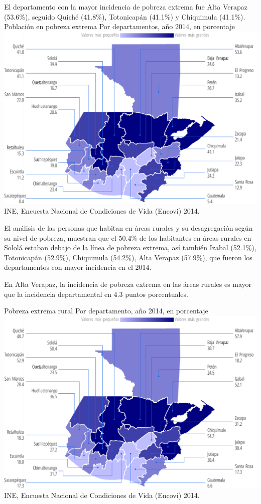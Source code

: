 %
{%
	El departamento con la mayor incidencia de pobreza extrema fue Alta Verapaz (53.6\%), seguido Quiché (41.8\%), Totonicapán (41.1\%) y Chiquimula (41.1\%).
} %
{%
	Población en pobreza extrema }%
{%
	Por departamentos, año 2014, en porcentaje} %
{%
	\includegraphics[width=52\cuadri]{graficas/1_18.pdf}}%
{%
	INE, Encuesta Nacional de Condiciones de Vida (Encovi) 2014.} %


%
{%
	El análisis de las personas que habitan en áreas rurales y su desagregación según su nivel de pobreza, muestran que el 50.4\% de los habitantes en áreas rurales en Sololá estaban debajo de la línea de pobreza extrema, así también Izabal (52.1\%), Totonicapán (52.9\%), Chiquimula (54.2\%), Alta Verapaz (57.9\%), que fueron los departamentos con mayor incidencia en el 2014.
	
	En Alta Verapaz, la incidencia de pobreza extrema en las áreas rurales es mayor que la incidencia departamental en 4.3 puntos porcentuales.}%
{%
	Pobreza extrema rural
} %
{%
	Por departamento, año 2014, en porcentaje} %
{%
	\includegraphics[width=52\cuadri]{graficas/1_16.pdf}}%
{%
	INE, Encuesta Nacional de Condiciones de Vida (Encovi) 2014.} %

